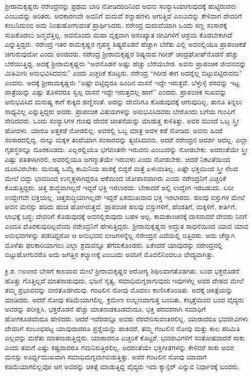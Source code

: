ಶ‍್ರೀರಾಮಕೃಷ್ಣರು ನರೇಂದ್ರನನ್ನು ಪ್ರಥಮ ಬಾರಿ ನೋಡಿದಂದಿನಿಂದ ಅವನು ಸಂನ್ಯಾಸಿಯಾಗುವುದಕ್ಕೆ ಹುಟ್ಟಿರುವನು ಎಂಬುದನ್ನು ಅರಿತರು. ಆದಕಾರಣವೇ ಅವನಿಗೆ ಮದುವೆ ಸನ್ನಾಹಗಳು ಆಗುತ್ತಿವೆ ಎಂಬುದನ್ನು ಕೇಳಿದಾಗ ದೇವರಿಗೆ ಕಂಬನಿದುಂಬಿ ಅದು ನಿಂತುಹೋಗುವಂತೆ ಪ್ರಾರ್ಥಿಸಿದರು. ನರೇಂದ್ರ ಮದುವೆಯಾಗಿ ಒಂದು ಸಣ್ಣ ಸಂಸಾರಕ್ಕೆ ಸುಖಕೊಡಲು ಜನ್ಮವೆತ್ತಿಲ್ಲ. ಅವನೊಂದು ಮಹಾ ವೃಕ್ಷವಾಗಿ ಅಸಂಖ್ಯಾತ ಜೀವಿಗಳಿಗೆ ಆಶ್ರಯ ಕೊಡಬೇಕಾಗಿದೆ ಎನ್ನುತ್ತಿದ್ದರು. ನರೇಂದ್ರ ಇತರ ರಾಮಕೃಷ್ಣರ ಗೃಹಸ್ಥ ಶಿಷ್ಯರೊಡನೆ ಹೆಚ್ಚಾಗಿ ಬೆರೆತು ಎಲ್ಲಿ ಅವನಲ್ಲಿಯೂ ಪ್ರಾಪಂಚಿಕತೆ ಚಿಗುರುವುದೋ ಎಂದು ಅಂಜಿದರು. ನರೇಂದ್ರ ಶ‍್ರೀರಾಮಕೃಷ್ಣರ ಶಿಷ್ಯನಾದ ಗಿರೀಶ್ ಚಂದ್ರಘೋಷ್‍ನೊಡನೆ ಹೆಚ್ಚು ಬೆರೆಯುತ್ತಿದ್ದ. ಅದಕ್ಕೆ ಶ‍್ರೀರಾಮಕೃಷ್ಣರು “ಅವನೊಡನೆ ಅಷ್ಟು ಹೆಚ್ಚು ಬೆರೆಯಬೇಡ. ಅವನು ಪ್ರಾಪಂಚಿಕ ಜೀವನವನ್ನು ಮಿತಿಮೀರಿ ಅನುಭವಿಸಿದವನು” ಎಂದು ಎಚ್ಚರಿಕೆ ಕೊಟ್ಟರು. ನರೇಂದ್ರ “ಗಿರೀಶ ಈಗ ಅದನ್ನೆಲ್ಲ ಬಿಟ್ಟುಬಿಟ್ಟಿರುವನು” ಎಂದನು. ಅದಕ್ಕೆ ಶ‍್ರೀರಾಮಕೃಷ್ಣರು “ಎಷ್ಟೇ ಬಿಟ್ಟಿದ್ದರೂ ಹಿಂದಿನ ವಾಸನೆ ಇದ್ದೇ ಇರುತ್ತದೆ. ಬೆಳ್ಳುಳ್ಳಿ ರಸವನ್ನು ಇಟ್ಟ ಪಾತ್ರೆಯನ್ನು ಎಷ್ಟು ತೊಳೆದರೂ ಸ್ವಲ್ಪ ವಾಸನೆ ಇದ್ದೇ ಇರುತ್ತದಲ್ಲ ಹಾಗೆ” ಎಂದರು. ಪ್ರಾಪಂಚಿಕ ಸುಖವನ್ನು ಅನುಭವಿಸಿದ ಮನುಷ್ಯ ಕಾಗೆ ಕುಕ್ಕಿದ ಹಣ್ಣಿನಂತೆ. ಅದನ್ನು ದೇವರಿಗೂ ಕೊಡುವುದಕ್ಕೆ ಆಗುವುದಿಲ್ಲ, ತಾನೂ ತಿನ್ನಲು ಸಾಧ್ಯವಿಲ್ಲ ಎನ್ನುತ್ತಿದ್ದರು ಅವರು. ಪ್ರಾಪಂಚಿಕ ವಿಷಯಗಳನ್ನು ಅನುಭವಿಸಿದವರು ಬೇರೊಂದು ಬಗೆಯ ಗುಂಪಿಗೆ ಸೇರಿದವರು. ಒಂದು ಸಂನ್ಯಾಸಿಗಳ ಗುಂಪು ದೇವರ ಚಿಂತನೆಯನ್ನು ಮಾಡುತ್ತ ಕುಳಿತಿತ್ತು. ಅವರ ಮುಂದೆ ಒಬ್ಬ ಸ್ತ್ರೀ ಹೋದಳು. ಯಾರೂ ಅತ್ತಕಡೆ ನೋಡಲಿಲ್ಲ. ಅವರಲ್ಲಿ ಒಬ್ಬ ಮಾತ್ರ ಅವಳ ಕಡೆ ನೋಡಿದ. ಅವನು ಹಿಂದೆ ಸಂಸಾರದಲ್ಲಿದ್ದ. ನಾಲ್ಕು ಮಕ್ಕಳ ತಂದೆಯಾಗಿ ಸಂಸಾರವನ್ನು ತ್ಯಜಿಸಿದವನು. ಆದರೆ ನರೇಂದ್ರನ ಆದರ್ಶ ಅದಲ್ಲ. ಎಲ್ಲಾ ಗೃಹಸ್ಥರನ್ನೂ ದೂರಕೂಡದು. ಎಲ್ಲರಲ್ಲಿಯೂ ಭಗವಂತನೇ ಇರುವನು ಎಂಬುದನ್ನು ನೋಡಬೇಕು. ಅದರಂತೆಯೇ ಸ್ತ್ರೀ ಎಷ್ಟು ಪತಿತಳಾಗಿರಲಿ, ಅವರಲ್ಲಿಯೂ ಜಗನ್ಮಾತೆಯೇ ಇರುವಳು ಎಂದು ನೋಡಬೇಕು. ಆದರೆ ನಿಕಟತೆಯಿಂದ ದೂರವಿರಬೇಕು. ಮನುಷ್ಯ ಒಮ್ಮೆ ಕಾಮಿನಿಯ ಪಾಶಕ್ಕೆ ಬಿದ್ದರೆ ಮತ್ತೆ ಏಳುವಂತಿಲ್ಲ. ಎಷ್ಟೇ ಭಕ್ತಿಯಿಂದ ಸ್ತ್ರೀ ನೆಲದ ಮೇಲೆ ಬಿದ್ದು ಭಾವದಿಂದ ಉನ್ಮತ್ತಳಾಗಿದ್ದರೂ ಆಕೆಯಿಂದ ಜೋಪಾನವಾಗಿರು ಎಂದು ನರೇಂದ್ರನಿಗೆ ಎಚ್ಚರಿಕೆ ಕೊಡುತ್ತಿದ್ದರು. ಚಿತ್ತ ಶುದ್ಧವಾಗಿಲ್ಲದೆ ಇದ್ದರೆ ಭಕ್ತಿ ಇರಲಾರದು. ಬೇಕಾದರೆ ಅಲ್ಲಿ ಉದ್ವೇಗ ಇರಬಹುದು. ಬರೀ ಉದ್ವೇಗವೇ ಭಕ್ತಿಯಲ್ಲ. ಚಿತ್ತಶುದ್ಧಿಯಾಗಿಲ್ಲದೇ ಇದ್ದರೆ ಏಕಮುಖವಾದ ಭಕ್ತಿ ಇರಲಾರದು. ಹಲವು ವಸ್ತುಗಳ ಮೇಲೆ ಅವನ ಮನಸ್ಸು ಹರಿದು ಹಂಚಿ ಹೋಗಿರುತ್ತದೆ. ಪ್ರಾಪಂಚಿಕ ಹಲವು ವಸ್ತುಗಳಿಗೆ, ಹೆಂಡತಿಗೆ, ಮಕ್ಕಳಿಗೆ, ಕೀರ್ತಿಗೆ, ಲಾಭಕ್ಕೆ ಬದ್ಧ; ದೇವರಿಗೆ ಕೊಡುವುದಕ್ಕೆ ಅವನಲ್ಲಿರುವುದು ಬಹಳ ಅಲ್ಪ. ಕಾಮಕಾಂಚನಕ್ಕೆ ದಾಸನಾದರೆ ದೇವರು ನಿನಗೆ ಎಂದೂ ದೊರಕುವುದಿಲ್ಲವೆಂದು ನರೇಂದ್ರನಿಗೆ ಹೇಳುತ್ತಿದ್ದರು. ಶ‍್ರೀರಾಮಕೃಷ್ಣರು ಅದ್ಭುತ ಸಾಧನೆಯಿಂದ ಯಾವ ಯಾವ ಅನುಭವಗಳನ್ನು ಪಡೆದಿದ್ದರೋ ಆ ಅನುಭವದ ಬೀಜಗಳನ್ನೆಲ್ಲ ನರೇಂದ್ರನ ಎದೆಯಲ್ಲಿ ಬಿತ್ತಿದರು. ಅದು ಚೆನ್ನಾಗಿ ಮೊಳೆತು ಫಲಕಾರಿಯಾಗಲು ಎಲ್ಲಾ ಶ್ರಮವನ್ನೂ ತೆಗೆದುಕೊಂಡರು. ಏಕೆಂದರೆ ಯಾವುದನ್ನು ನರೇಂದ್ರನಲ್ಲಿ ಬಿಟ್ಟುಹೋಗುವರೊ ಅದು ಜಗತ್ತಿನ ಕಲ್ಯಾಣಕ್ಕೆ ಎಂಬುದು ಅವರಿಗೆ ಮೊದಲಿನಿಂದಲೂ ವೇದ್ಯವಾಗಿತ್ತು.

ಕ್ರಿ.ಶ. ೧೮೮೫ರ ಬೇಸಗೆ ಕಾಲವಾದ ಮೇಲೆ ಶ‍್ರೀರಾಮಕೃಷ್ಣರ ಆರೋಗ್ಯ ಶಿಥಿಲವಾಗತೊಡಗಿತು. ಬಂದ ಭಕ್ತರೊಡನೆ ಹೊತ್ತು ಗೊತ್ತಿಲ್ಲದೆ ಮಾತನಾಡುವುದು, ಭಜನೆ ನೃತ್ಯ, ಸಮಾಧಿಮಗ್ನರಾಗುವುದು ಇವುಗಳೆಲ್ಲ ಅವರ ದೇಹದ ಮೇಲೆ ತಮ್ಮ ಪ್ರಭಾವವನ್ನು ಬೀರತೊಡಗಿದುವು. ಗಂಟಲಿನ ನೋವು ಮೊದಲು ಕಾಣಿಸಿಕೊಂಡಿತು. ಅದಕ್ಕೆ ಚಿಕಿತ್ಸೆಯನ್ನು ಮಾಡಿದರು. ಆದರೆ ನೋವು ಕಡಿಮೆಯಾಗಲಿಲ್ಲ. ಕ್ರಮೇಣ ಉಲ್ಬಣವಾಗುತ್ತ ಬಂದಿತು. ಕಲ್ಕತ್ತೆಯಿಂದ ಬಂದ ವೈದ್ಯರು ಅವರನ್ನು ಪರೀಕ್ಷಿಸಿ, ಭಕ್ತರೊಡನೆ ಹೆಚ್ಚು ಮಾತನಾಡಕೂಡದೆಂದೂ, ಭಕ್ತಿ ಪರವಶರಾಗಿ ಸಮಾಧಿಗೆ ಹೋಗಕೂಡದೆಂದೂ ಹೇಳಿದರು. ಆದರೆ ಇವೆರಡನ್ನೂ ಅವರು ನೆರವೇರಿಸುವಂತಿರಲಿಲ್ಲ. ಯಾರಾದರೂ ಭವಜೀವಿಗಳು ದೇವರಿಗೆ ಸಂಬಂಧಪಟ್ಟ ಯಾವುದಾದರೂ ಪ್ರಶ್ನೆಯನ್ನು ಹಾಕಿದರೆ, ತಮ್ಮ ಗಂಟಲಿನ ನೋವು ಮತ್ತು ಕಾಲ ಪರಿಮಿತಿ ಎಲ್ಲವನ್ನು ಮರೆತು ಮಾತನಾಡುತ್ತಿದ್ದರು. ಯಾರಾದರೂ ಎಚ್ಚರಿಕೆ ಕೊಟ್ಟರೆ, ಭವಜೀವಿಗಳಿಗೆ ಸಂತೋಷವಾದರೆ ಸಾಕು ಎಂದು ತಮಗೆ ಎಷ್ಟು ಕಷ್ಟವಾದರೂ ಗಮನಿಸುತ್ತಿರಲಿಲ್ಲ. ಅದರಂತೆಯೇ ಭಕ್ತಿಗೀತೆಗಳನ್ನು ಕೇಳಿದರೆ ಸಾಕು ಅವರ ಮನಸ್ಸು ಊರ್ಧ್ವಮುಖವಾಗಿ ಸಮಾಧಿಮಗ್ನವಾಗಿಬಿಡುತ್ತಿತ್ತು. ಅವರ ಗಂಟಲಿನ ನೋವು ಯಾವಾಗ ಕಡಿಮೆಯಾಗಲಿಲ್ಲವೋ ಆಗ ಅವರನ್ನು ಚಿಕಿತ್ಸೆ ಮಾಡುತ್ತಿದ್ದ ವೈದ್ಯರು ಇದು ಕ್ಯಾನ್ಸರ್ ಎನ್ನುವ ನಿರ್ಧಾರಕ್ಕೆ ಬಂದರು.

